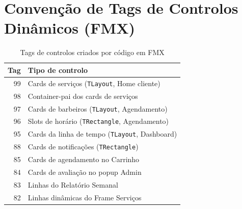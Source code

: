 \documentclass[12pt,a4paper]{article}
\begin{document}
\section{Convenção de Tags de Controlos Dinâmicos (FMX)}

\begin{table}[H]
\centering
\caption{Tags de controlos criados por código em FMX}
\begin{tabular}{@{}rl@{}}
\toprule
\textbf{Tag} & \textbf{Tipo de controlo} \\
\midrule
99 & Cards de serviços (\texttt{TLayout}, Home cliente) \\
98 & Container-pai dos cards de serviços \\
97 & Cards de barbeiros (\texttt{TLayout}, Agendamento) \\
96 & Slots de horário (\texttt{TRectangle}, Agendamento) \\
95 & Cards da linha de tempo (\texttt{TLayout}, Dashboard) \\
88 & Cards de notificações (\texttt{TRectangle}) \\
85 & Cards de agendamento no Carrinho \\
84 & Cards de avaliação no popup Admin \\
83 & Linhas do Relatório Semanal \\
82 & Linhas dinâmicas do Frame Serviços \\
\bottomrule
\end{tabular}
\end{table}
\end{document}

